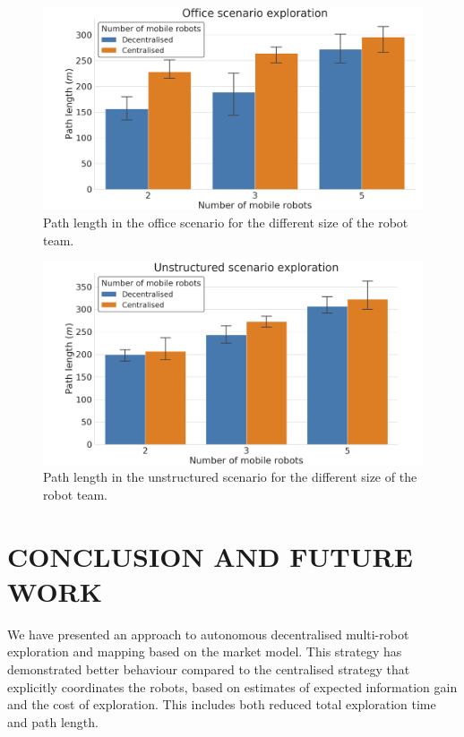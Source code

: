 \documentclass[letterpaper, 10 pt, conference]{ieeeconf}  %
\begin{document}
\begin{figure}[h!]
	\centering\includegraphics[width=0.9\columnwidth]{office_path.png}
	\caption{Path length in the office scenario for the different size of the robot team.}
	\label{fig:office_path}
\end{figure}

\begin{figure}[h!]
	\centering\includegraphics[width=0.9\columnwidth]{unstructured_path.png}
	\caption{Path length in the unstructured scenario for the different size of the robot team.}
	\label{fig:unstruc_path}
\end{figure}



\section{CONCLUSION AND FUTURE WORK}

We have presented an approach to autonomous decentralised multi-robot
exploration and mapping based on the market model. This strategy has demonstrated better behaviour compared to the centralised strategy that explicitly coordinates the robots, based on estimates of expected information gain and the cost of exploration. This includes both reduced total exploration time and path length.
\end{document}
